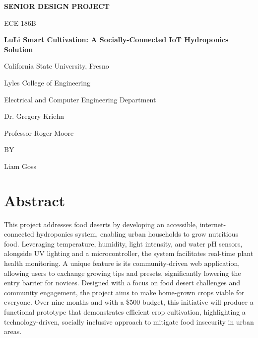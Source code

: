 \documentclass[12pt]{article} %
\begin{document}
\begin{titlepage}
    \centering
    {\Large\bfseries SENIOR DESIGN PROJECT\par}
    \vspace{1.5cm}
    {\Large ECE 186B\par}
    \vspace{1.5cm}
    {\Large\bfseries LuLi Smart Cultivation: A Socially-Connected IoT Hydroponics Solution\par}
    \vspace{3cm}
    {\large California State University, Fresno\par}
    {\large Lyles College of Engineering\par}
    {\large Electrical and Computer Engineering Department\par}
    \vspace{2cm}
    {\large Dr. Gregory Kriehn\par}
    {\large Professor Roger Moore\par}
    \vspace{2cm}
    {\large BY\par}
    \vspace{1cm}
    {\large Liam Goss\par}
\end{titlepage}
\pagebreak
\tableofcontents
\pagebreak

\listoftables
\pagebreak

\listoffigures
\pagebreak

\section*{Abstract}
\noindent This project addresses food deserts by developing an accessible, internet-connected hydroponics system, enabling urban households to grow nutritious food. Leveraging temperature, humidity, light intensity, and water pH sensors, alongside UV lighting and a microcontroller, the system facilitates real-time plant health monitoring. A unique feature is its community-driven web application, allowing users to exchange growing tips and presets, significantly lowering the entry barrier for novices. Designed with a focus on food desert challenges and community engagement, the project aims to make home-grown crops viable for everyone. Over nine months and with a \$500 budget, this initiative will produce a functional prototype that demonstrates efficient crop cultivation, highlighting a technology-driven, socially inclusive approach to mitigate food insecurity in urban areas.
\end{document}
